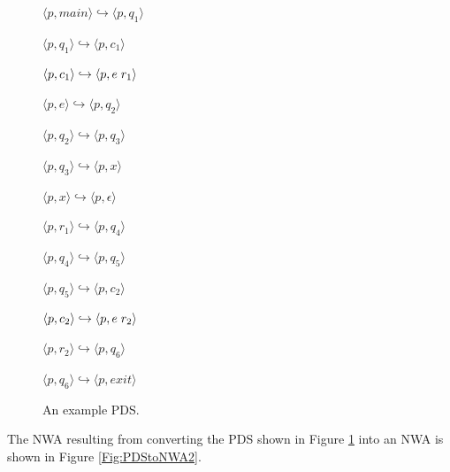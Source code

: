\documentclass{llncs}
\begin{document}
\begin{figure}[htbp]
  \centering
    \begin{description}
      \centering
      \item $\langle p,main \rangle \hookrightarrow \langle p,q_1 \rangle$
      \item $\langle p,q_1 \rangle \hookrightarrow \langle p,c_1 \rangle$
      \item $\langle p,c_1 \rangle \hookrightarrow \langle p,e \hspace{.1cm} r_1 \rangle$
      \item $\langle p,e \rangle \hookrightarrow \langle p,q_2 \rangle$
      \item $\langle p,q_2 \rangle \hookrightarrow \langle p,q_3 \rangle$
      \item $\langle p,q_3 \rangle \hookrightarrow \langle p,x \rangle$
      \item $\langle p,x \rangle \hookrightarrow \langle p,\epsilon \rangle$
      \item $\langle p,r_1 \rangle \hookrightarrow \langle p,q_4 \rangle$
      \item $\langle p,q_4 \rangle \hookrightarrow \langle p,q_5 \rangle$
      \item $\langle p,q_5 \rangle \hookrightarrow \langle p,c_2 \rangle$
      \item $\langle p,c_2 \rangle \hookrightarrow \langle p,e \hspace{.1cm} r_2 \rangle$
      \item $\langle p,r_2 \rangle \hookrightarrow \langle p,q_6 \rangle$
      \item $\langle p,q_6 \rangle \hookrightarrow \langle p,exit \rangle$
    \end{description}
  \caption{An example PDS.}
  \label{Fig:PDStoNWA1}
\end{figure}

\noindent The NWA resulting from converting the PDS shown in Figure \ref{Fig:PDStoNWA1} into an NWA is shown in Figure \ref{Fig:PDStoNWA2}.
\end{document}
